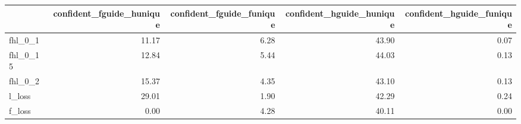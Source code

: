 \begin{tabular}{lrrrr}
\toprule
 & confident_fguide_hunique & confident_fguide_funique & confident_hguide_hunique & confident_hguide_funique \\
\midrule
fhl_0_1 & 11.17 & 6.28 & 43.90 & 0.07 \\
fhl_0_15 & 12.84 & 5.44 & 44.03 & 0.13 \\
fhl_0_2 & 15.37 & 4.35 & 43.10 & 0.13 \\
l_loss & 29.01 & 1.90 & 42.29 & 0.24 \\
f_loss & 0.00 & 4.28 & 40.11 & 0.00 \\
\bottomrule
\end{tabular}
